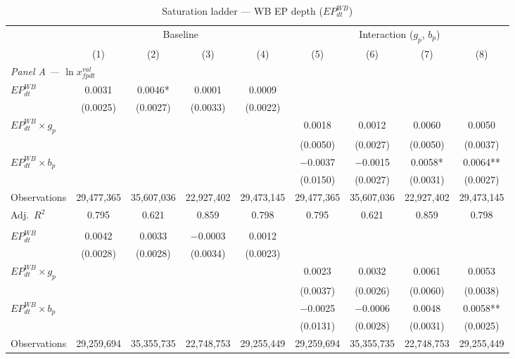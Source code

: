 \documentclass{article}
\begin{document}
\begin{table}[htbp]
\centering
\footnotesize
\caption{Saturation ladder --- WB EP depth ($EP^{WB}_{dt}$)}
\label{tab:ladder_wb}
\begin{threeparttable}
\begin{tabular}{lcccccccc}
\toprule
 & \multicolumn{4}{c}{Baseline} & \multicolumn{4}{c}{Interaction ($g_p$, $b_p$)} \\
\cmidrule(lr){2-5}\cmidrule(lr){6-9}
 & (1) & (2) & (3) & (4) & (5) & (6) & (7) & (8) \\
\midrule
\multicolumn{9}{l}{\textit{Panel A --- $\ln x^{val}_{fpdt}$}} \\[3pt]
\quad $EP^{WB}_{dt}$ & 0.0031 & 0.0046* & 0.0001 & 0.0009 &  &  &  &  \\
 & (0.0025) & (0.0027) & (0.0033) & (0.0022) &  &  &  &  \\
\quad $EP^{WB}_{dt} \times g_p$ &  &  &  &  & 0.0018 & 0.0012 & 0.0060 & 0.0050 \\
 &  &  &  &  & (0.0050) & (0.0027) & (0.0050) & (0.0037) \\
\quad $EP^{WB}_{dt} \times b_p$ &  &  &  &  & $-$0.0037 & $-$0.0015 & 0.0058* & 0.0064** \\
 &  &  &  &  & (0.0150) & (0.0027) & (0.0031) & (0.0027) \\[3pt]
Observations & 29,477,365 & 35,607,036 & 22,927,402 & 29,473,145 & 29,477,365 & 35,607,036 & 22,927,402 & 29,473,145 \\
Adj.\ $R^2$ & 0.795 & 0.621 & 0.859 & 0.798 & 0.795 & 0.621 & 0.859 & 0.798 \\
\addlinespace[6pt]
\midrule
\multicolumn{9}{l}{\textit{Panel B --- $\ln x^{qua}_{fpdt}$}} \\[3pt]
\quad $EP^{WB}_{dt}$ & 0.0042 & 0.0033 & $-$0.0003 & 0.0012 &  &  &  &  \\
 & (0.0028) & (0.0028) & (0.0034) & (0.0023) &  &  &  &  \\
\quad $EP^{WB}_{dt} \times g_p$ &  &  &  &  & 0.0023 & 0.0032 & 0.0061 & 0.0053 \\
 &  &  &  &  & (0.0037) & (0.0026) & (0.0060) & (0.0038) \\
\quad $EP^{WB}_{dt} \times b_p$ &  &  &  &  & $-$0.0025 & $-$0.0006 & 0.0048 & 0.0058** \\
 &  &  &  &  & (0.0131) & (0.0028) & (0.0031) & (0.0025) \\[3pt]
Observations & 29,259,694 & 35,355,735 & 22,748,753 & 29,255,449 & 29,259,694 & 35,355,735 & 22,748,753 & 29,255,449 \\

\end{tabular}
\end{threeparttable}
\end{table}
\end{document}
